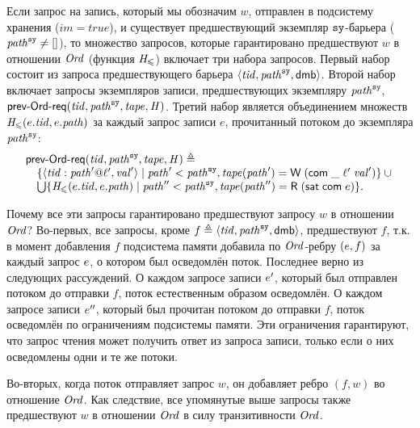 Если запрос на запись, который мы обозначим $w$,
отправлен в подсистему хранения ($im = \mathit{true}$),
и существует предшествующий экземпляр $\mathtt{sy}$-барьера ($\mathit{path}^{\mathtt{sy}} \neq []$),
то множество запросов, которые гарантировано предшествуют $w$ в отношении $\mathit{Ord}$
(функция $\mathit{H}_{\leqslant}$) включает три набора запросов.
Первый набор состоит из запроса предшествующего барьера $\langle \mathit{tid}, \mathit{path}^{\mathtt{sy}}, {\sf dmb} \rangle$.
Второй набор включает запросы экземпляров записи, предшествующих экземпляру $\mathit{path}^{\mathtt{sy}}$,
$\textup{\sf prev-Ord-req}(\mathit{tid}, \mathit{path}^{\mathtt{sy}}, \mathit{tape}, \mathit{H})$.
Третий набор является объединением множеств $\mathit{H}_{\leqslant}(e.\mathit{tid}, e.\mathit{path})$ за каждый запрос записи $e$,
прочитанный потоком до экземпляра $\mathit{path}^{\mathtt{sy}}$:
\[\begin{array}{l}
\textup{\sf prev-Ord-req}(\mathit{tid}, \mathit{path}^{\mathtt{sy}}, \mathit{tape}, \mathit{H}) \triangleq\\
\quad \{ \langle \mathit{tid}:\mathit{path}'@\ell',\mathit{val}' \rangle \mid \mathit{path}'  < \mathit{path}^{\mathtt{sy}},
          \mathit{tape}(\mathit{path}' ) = \textsf{W} \; (\mathsf{com} \; \_ \; \ell' \; \mathit{val}') \} \cup {}\\
\quad \bigcup \{ \mathit{H}_{\leqslant}(e.\mathit{tid}, e.\mathit{path}) \mid
                   \mathit{path}'' < \mathit{path}^{\mathtt{sy}}, \mathit{tape}(\mathit{path}'') = \textsf{R} \; (\mathsf{sat} \; \mathsf{com} \; e) \}. 
\end{array}\]

Почему все эти запросы гарантировано предшествуют запросу $w$ в отношении $\mathit{Ord}$?
Во-первых, все запросы, кроме $f \triangleq \langle \mathit{tid}, \mathit{path}^{\mathtt{sy}}, {\sf dmb} \rangle$, предшествуют $f$,
т.к. в момент добавления $f$ подсистема памяти добавила по $\mathit{Ord}$-ребру $(e, f)$ за
каждый запрос $e$, о котором был осведомлён поток.
Последнее верно из следующих рассуждений.
О каждом запросе записи $e'$, который был отправлен потоком до отправки $f$,
поток естественным образом осведомлён.
О каждом запросе записи $e''$, который был прочитан потоком до отправки $f$,
поток осведомлён по ограничениям подсистемы памяти.
Эти ограничения гарантируют, что запрос чтения может получить ответ из
запроса записи, только если о них осведомлены одни и те же потоки.

Во-вторых, когда поток отправляет запрос $w$, он добавляет ребро $(f, w)$ во отношение $\mathit{Ord}$.
Как следствие, все упомянутые выше запросы также предшествуют $w$ в отношении $\mathit{Ord}$
в силу транзитивности $\mathit{Ord}$.

